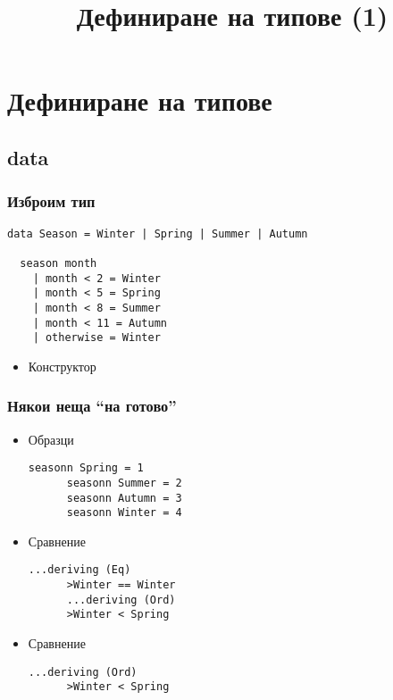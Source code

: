 \documentclass{beamer}
\begin{document}
\title[Увод в курса]{Дефиниране на типове (1)}
\frame{\titlepage}

\section{Дефиниране на типове}
\subsection{data}


\begin{frame}[fragile]
  \frametitle{Изброим тип}

\begin{lstlisting}[basicstyle=\small]
  data Season = Winter | Spring | Summer | Autumn

  season month
    | month < 2 = Winter
    | month < 5 = Spring
    | month < 8 = Summer
    | month < 11 = Autumn
    | otherwise = Winter
\end{lstlisting}

\begin{itemize}
  \item Конструктор
\end{itemize}

\end{frame}

\begin{frame}[fragile]
  \frametitle{Някои неща ``на готово''}

\begin{itemize}
  \item Образци
  \begin{lstlisting}[basicstyle=\small]
      seasonn Spring = 1
      seasonn Summer = 2
      seasonn Autumn = 3
      seasonn Winter = 4
  \end{lstlisting}
  \item Сравнение
  \begin{lstlisting}[basicstyle=\small]
      ...deriving (Eq)
      >Winter == Winter
      ...deriving (Ord)
      >Winter < Spring
  \end{lstlisting}
  \item Сравнение
  \begin{lstlisting}[basicstyle=\small]
      ...deriving (Ord)
      >Winter < Spring
  \end{lstlisting}
\end{itemize}

\end{frame}
\end{document}
